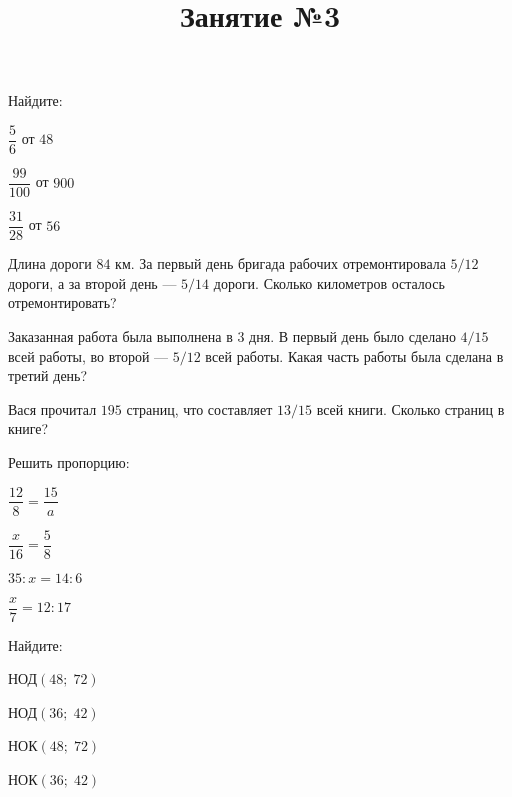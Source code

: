 \begin{listofex}
	\item Найдите:
	\begin{enumcols}[itemcolumns=3]
		\item \( \dfrac{5}{6} \) от \( 48 \)
		\item \( \dfrac{99}{100} \) от \( 900 \)
		\item \( \dfrac{31}{28} \) от \( 56 \)
	\end{enumcols}
	\item Длина дороги \( 84 \) км. За первый день бригада рабочих отремонтировала \( 5/12 \) дороги, а за второй день --- \( 5/14 \) дороги. Сколько километров осталось отремонтировать?
	\item Заказанная работа была выполнена в \( 3 \) дня. В первый день было сделано \( 4/15 \) всей работы, во второй --- \( 5/12 \) всей работы. Какая часть работы была сделана в третий день?
	\item Вася прочитал \( 195 \) страниц, что составляет \( 13/15 \) всей книги. Сколько страниц в книге?
	\item Решить пропорцию:
	\begin{enumcols}[itemcolumns=4]
		\item \( \dfrac{12}{8}=\dfrac{15}{a} \)
		\item \( \dfrac{x}{16}=\dfrac{5}{8} \)
		\item \( 35:x=14:6 \)
		\item \( \dfrac{x}{7}=12:17 \)
	\end{enumcols}
	\item Найдите:
	\begin{enumcols}[itemcolumns=4]
		\item НОД\( (48;\;72) \)
		\item НОД\( (36;\;42) \)
		\item НОК\( (48;\;72) \)
		\item НОК\( (36;\;42) \)
	\end{enumcols}
\end{listofex}
\newpage
\title{Занятие №3}
